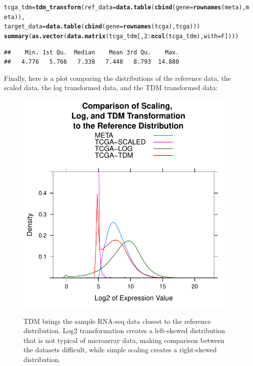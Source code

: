 \documentclass{article}\usepackage[]{graphicx}\usepackage[]{color}
\makeatletter
\newcommand{\hlnum}[1]{\textcolor[rgb]{0.686,0.059,0.569}{#1}}%
\newcommand{\hlopt}[1]{\textcolor[rgb]{0,0,0}{#1}}%
\newcommand{\hlstd}[1]{\textcolor[rgb]{0.345,0.345,0.345}{#1}}%
\newcommand{\hlkwb}[1]{\textcolor[rgb]{0.69,0.353,0.396}{#1}}%
\newcommand{\hlkwc}[1]{\textcolor[rgb]{0.333,0.667,0.333}{#1}}%
\newcommand{\hlkwd}[1]{\textcolor[rgb]{0.737,0.353,0.396}{\textbf{#1}}}%
\newenvironment{kframe}{%
 \def\at@end@of@kframe{}%
 \ifinner\ifhmode%
  \def\at@end@of@kframe{\end{minipage}}%
  \begin{minipage}{\columnwidth}%
 \fi\fi%
 \def\FrameCommand##1{\hskip\@totalleftmargin \hskip-\fboxsep
 \colorbox{shadecolor}{##1}\hskip-\fboxsep
     \hskip-\linewidth \hskip-\@totalleftmargin \hskip\columnwidth}%
 \MakeFramed {\advance\hsize-\width
   \@totalleftmargin\z@ \linewidth\hsize
   \@setminipage}}%
 {\par\unskip\endMakeFramed%
 \at@end@of@kframe}
\newenvironment{knitrout}{}{} %
\makeatother
\begin{document}
\begin{knitrout}
\color{fgcolor}\begin{kframe}
\begin{alltt}
\hlstd{tcga_tdm} \hlkwb{=} \hlkwd{tdm_transform}\hlstd{(}\hlkwc{ref_data} \hlstd{=} \hlkwd{data.table}\hlstd{(}\hlkwd{cbind}\hlstd{(}\hlkwc{gene}\hlstd{=}\hlkwd{rownames}\hlstd{(meta), meta)),}
\hlkwc{target_data} \hlstd{=} \hlkwd{data.table}\hlstd{(}\hlkwd{cbind}\hlstd{(}\hlkwc{gene}\hlstd{=}\hlkwd{rownames}\hlstd{(tcga), tcga)))}
\hlkwd{summary}\hlstd{(}\hlkwd{as.vector}\hlstd{(}\hlkwd{data.matrix}\hlstd{(tcga_tdm[,}\hlnum{2}\hlopt{:}\hlkwd{ncol}\hlstd{(tcga_tdm),}\hlkwc{with}\hlstd{=F])))}
\end{alltt}
\begin{verbatim}
##    Min. 1st Qu.  Median    Mean 3rd Qu.    Max. 
##   4.776   5.766   7.338   7.448   8.793  14.880
\end{verbatim}
\end{kframe}
\end{knitrout}

Finally, here is a plot comparing the distributions of the reference data, the
scaled data, the log transformed data, and the TDM transformed data:



\begin{figure}
  \includegraphics{figures/comparison-1}
  \label{fig:comparison}
  \caption{TDM brings the sample RNA-seq data closest to the reference distribution. Log2 transformation creates a left-skewed distribution that is not typical of microarray data, making comparison between the datasets difficult, while simple scaling creates a right-skewed distribution.}
\end{figure}
\end{document}
